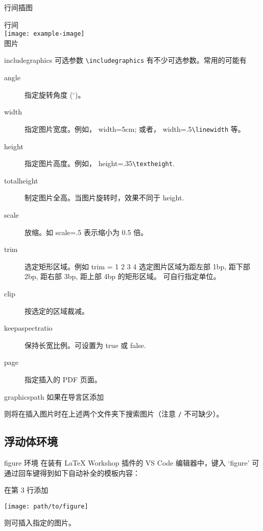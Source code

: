 \documentclass[final]{ctexbeamer}
\begin{document}
\begin{frame}[fragile]{行间插图}
\begin{vertlst}
行间 \\ \texttt{[image: example-image]} \\ 图片
\end{vertlst}
\end{frame}


\begin{frame}[fragile]{includegraphics 可选参数}
\verb+\includegraphics+ 有不少可选参数。常用的可能有
\begin{description}
  \item[angle] 指定旋转角度 ($^\circ$)。
  \item[width] 指定图片宽度。例如， width=5cm; 或者， width=.5\verb+\linewidth+ 等。
  \item[height] 指定图片高度。例如， height=.35\verb+\textheight+.
  \item[totalheight] 制定图片全高。当图片旋转时，效果不同于 height.
  \item[scale] 放缩。如 scale=.5 表示缩小为 0.5 倍。 
  \item[trim] 选定矩形区域。例如 trim = 1 2 3 4 选定图片区域为距左部 1bp, 距下部 2bp, 距右部 3bp, 距上部 4bp 的矩形区域。 可自行指定单位。
  \item[clip] 按选定的区域裁减。
  \item[keepaspectratio] 保持长宽比例。可设置为 true 或 false. 
  \item[page] 指定插入的 PDF 页面。 
\end{description}
\end{frame}


\begin{frame}[fragile]{graphicspath}
如果在导言区添加
\begin{texlst}
\graphicspath{{Demos/}{Images/}}
\end{texlst}
则将在插入图片时在上述两个文件夹下搜索图片（注意 \verb+/+ 不可缺少）。
\end{frame}


\subsection{浮动体环境}
\begin{frame}[fragile]{figure 环境}
在装有 LaTeX Workshop 插件的 VS Code 编辑器中，键入 `figure' 可通过回车键得到如下自动补全的模板内容：
\begin{texlst}
\begin{figure}[]
  \centering
  
  \caption{}
  \label{}
\end{figure}
\end{texlst}
在第 3 行添加
\begin{texlst}
\texttt{[image: path/to/figure]}
\end{texlst}
则可插入指定的图片。
\end{frame}
\end{document}
